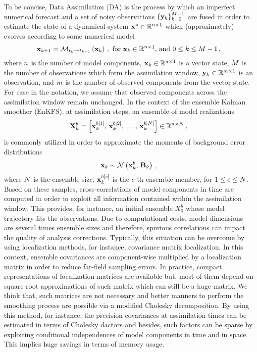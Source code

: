 To be concise, Data Assimilation (DA) is the process by which an imperfect numerical forecast and a set of noisy observations $\left \{ {\bf y}_k\right \}_{k=0}^{M-1}$ are fused in order to estimate the state of a dynamical system ${\bf x}^{*} \in \mathbb{R}^{n \times 1}$ which (approximately) evolves according to some numerical model
\begin{eqnarray}
\label{eq:numerical-model}
\displaystyle
{\bf x}_{k+1} = \mathcal{M}_{t_k \rightarrow t_{k+1}} \left ( {\bf x}_k \right )\,, \text{ for ${\bf x}_k \in \mathbb{R}^{n \times 1}$, and $0 \le k \le M-1$} \,,
\end{eqnarray}
%
where $n$ is the number of model components, ${\bf x}_k \in \mathbb{R}^{n \times 1}$ is a vector state, $M$ is the number of observations which form the assimilation window, ${\bf y}_k \in \mathbb{R}^{m \times 1}$ is an observation, and $m$ is the number of observed components from the vector state. For ease in the notation, we assume that observed components across the assimilation window remain unchanged. In the context of the ensemble Kalman smoother (EnKFS), at assimilation steps, an ensemble of model realizations 
\begin{eqnarray}
\label{eq:ensemble-model-realizations}
\displaystyle
{\bf X}^b_k = \left [ {\bf x}^{b[1]}_k,\, {\bf x}^{b[2]}_k,\, \ldots,\, {\bf x}^{b[N]}_k \right ] \in \mathbb{R}^{n \times N} \,,
\end{eqnarray}
is commonly utilized in order to approximate the moments of background error distributions
\begin{eqnarray}
\label{eq:background-error-distribution}
\displaystyle
{\bf x}_k \sim \mathcal{N} \left ( {\bf x}_k^b,\,{\bf B}_k \right ) \,,
\end{eqnarray}
%
where $N$ is the ensemble size, ${\bf x}^{b[e]}_k$ is the $e$-th ensemble member, for $1 \le e \le N$. Based on these samples, cross-correlations of model components in time are computed in order to exploit all information contained within the assimilation window. This provides, for instance, an initial ensemble $X_0^b$ whose model trajectory fits the observations. Due to computational costs, model dimensions are several times ensemble sizes and therefore, spurious correlations can impact the quality of analysis corrections. Typically, this situation can be overcome by using localization methods, for instance, covariance matrix localization. In this context, ensemble covariances are component-wise multiplied by a localization matrix in order to reduce far-field sampling errors. In practice, compact representations of localization matrices are available but, most of them depend on square-root approximations of such matrix which can still be a huge matrix. We think that, such matrices are not necessary and better manners to perform the smoothing process are possible via a modified Cholesky decomposition. By using this method, for instance, the precision covariances at assimilation times can be estimated in terms of Cholesky dactors and besides, such factors can be sparse by exploiting conditional independences of model components in time and in space. This implies huge savings in terms of memory usage.

